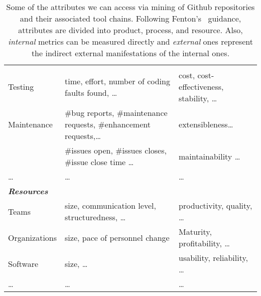 \begin{table}[!t]
{\begin{tabular}{l|ll}
 &  &  \\
Testing & time, effort, number of coding faults found, \dots & cost, cost-effectiveness, stability, \dots \\
Maintenance & \#bug reports, \#maintenance requests, \#enhancement requests,\ldots & extensibleness\dots\\
            & \#issues open, \#issues closes, \#issue close time  \dots &   maintainability \dots \\
\dots & \dots & \dots \\  
\textit{\textbf{Resources}} &  &  \\ \hline
Teams & size, communication level, structuredness, \dots & productivity, quality, \dots \\
Organizations & size, pace of personnel change %
& Maturity, profitability, \dots \\
Software &   size, \dots & usability, reliability, \dots \\
\dots & \dots & \dots \\ 
\end{tabular}}
\caption{Some of the attributes we can access via mining of Github repositories and their associated tool chains.
Following  Fenton's~\cite{Fe14} guidance,  attributes are divided into product, process, and resource. Also, {\em internal}
metrics can be measured directly and {\em external} ones
represent the indirect external manifestations of the internal ones.  }
\label{tab:metrics}
\end{table}